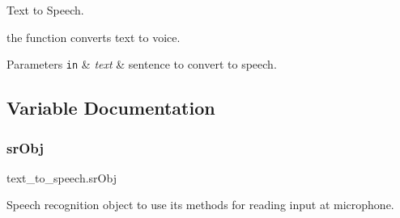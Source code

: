 Text to Speech. 

the function converts text to voice.


\begin{DoxyParams}[1]{Parameters}
\mbox{\tt in}  & {\em text} & sentence to convert to speech. \\
\hline
\end{DoxyParams}


\subsection{Variable Documentation}
\mbox{\label{namespacetext__to__speech_aa2ceb201cb1da42ee4cf35154081d8ae}} 
\subsubsection{\texorpdfstring{sr\+Obj}{srObj}}
{\footnotesize\ttfamily text\+\_\+to\+\_\+speech.\+sr\+Obj}



Speech recognition object to use its methods for reading input at microphone. 

